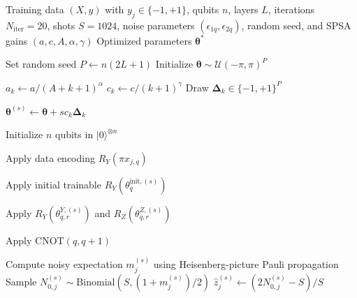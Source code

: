 \documentclass[final,5p,times,number]{elsarticle}
\begin{document}
\begin{algorithm}[!htbp]
\caption{SPSA-Based VQC Training for Classification}
\label{alg:vqc}
\begin{algorithmic}[1]
\REQUIRE Training data $(X,y)$ with $y_j\in\{-1,+1\}$,
qubits $n$, layers $L$, iterations $N_{\mathrm{iter}}=20$,
shots $S=1024$, noise parameters
$(\epsilon_{1q},\epsilon_{2q})$, random seed,
and SPSA gains $(a,c,A,\alpha,\gamma)$
\ENSURE Optimized parameters $\boldsymbol{\theta}^*$

\STATE Set random seed
\STATE $P\leftarrow n(2L+1)$
\STATE Initialize
$\boldsymbol{\theta}\sim\mathcal{U}(-\pi,\pi)^P$


    \STATE $a_k\leftarrow a/(A+k+1)^\alpha$
    \STATE $c_k\leftarrow c/(k+1)^\gamma$
    \STATE Draw $\boldsymbol{\Delta}_k\in\{-1,+1\}^P$


        \STATE $\boldsymbol{\theta}^{(s)}
        \leftarrow\boldsymbol{\theta}
        +s c_k\boldsymbol{\Delta}_k$


            \STATE Initialize $n$ qubits in
            $\lvert 0\rangle^{\otimes n}$

                \STATE Apply data encoding
                $R_Y(\pi x_{j,q})$
            \ENDFOR

                \STATE Apply initial trainable
                $R_Y(\theta_q^{\mathrm{init},(s)})$
            \ENDFOR


                    \STATE Apply
                    $R_Y(\theta_{q,r}^{Y,(s)})$
                    and $R_Z(\theta_{q,r}^{Z,(s)})$
                \ENDFOR

                    \STATE Apply
                    $\mathrm{CNOT}(q,q+1)$
                \ENDFOR

            \ENDFOR

            \STATE Compute noisy expectation
$m_j^{(s)}$ using Heisenberg-picture
Pauli propagation
\STATE Sample $N_{0,j}^{(s)}
\sim \mathrm{Binomial}
(S,(1+m_j^{(s)})/2)$
\STATE $\hat{z}_j^{(s)}
\leftarrow (2N_{0,j}^{(s)}-S)/S$

        \ENDFOR


\end{algorithmic}
\end{algorithm}
\end{document}
